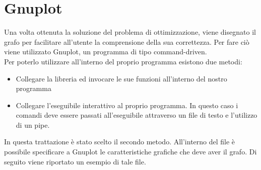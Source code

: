 \section{Gnuplot}\label{gnuplot}
Una volta ottenuta la soluzione del problema di ottimizzazione, viene disegnato il grafo per facilitare all'utente la comprensione della sua correttezza. Per fare ciò viene utilizzato Gnuplot, un programma di tipo command-driven.\\
Per poterlo utilizzare all'interno del proprio programma esistono due metodi:
\begin{itemize}
\item{Collegare la libreria ed invocare le sue funzioni all'interno del nostro programma}
\item{Collegare l'eseguibile interattivo al proprio programma. In questo caso i comandi deve essere passati all'eseguibile attraverso un file di testo e l'utilizzo di un pipe.}\\
\end{itemize}
In questa trattazione è stato scelto il secondo metodo. All'interno del file è possibile specificare a Gnuplot le caratteristiche grafiche che deve aver il grafo. Di seguito viene riportato un esempio di tale file.\\




